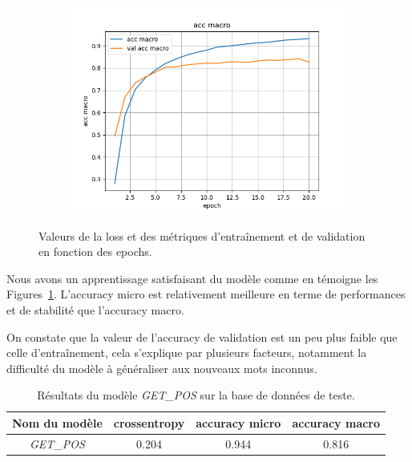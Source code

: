 \documentclass[a4paper]{article}
\begin{document}
\begin{figure}[H]
\begin{subfigure}{0.32\textwidth}
    \end{subfigure}
    \begin{subfigure}{0.32\textwidth}
        \centering
        \includegraphics[width=\linewidth]{../logs/get_pos/acc macro.png}
    \end{subfigure}
    \caption{Valeurs de la loss et des métriques d'entraînement et de validation en fonction des epochs.}
    \label{fig: train getpos}
\end{figure}

Nous avons un apprentissage satisfaisant du modèle comme en témoigne les Figures~\ref{fig: train getpos}. 
L'accuracy micro est relativement meilleure en terme de performances et de stabilité que l'accuracy macro.

On constate que la valeur de l'accuracy de validation est un peu plus faible que celle d'entraînement, cela 
s'explique par plusieurs facteurs, notamment la difficulté du modèle à généraliser aux nouveaux mots inconnus.


\begin{table}[H]
    \centering
    \begin{tabular}{|c|c|c|c|}
        \hline
        Nom du modèle & crossentropy & accuracy micro & accuracy macro \\
        \hline
        \textit{GET\_POS} & 0.204 & 0.944 & 0.816\\
        \hline
    \end{tabular}
    \caption{Résultats du modèle \textit{GET\_POS} sur la base de données de teste.}
    \label{tab:test getpos}
\end{table}
\end{document}

